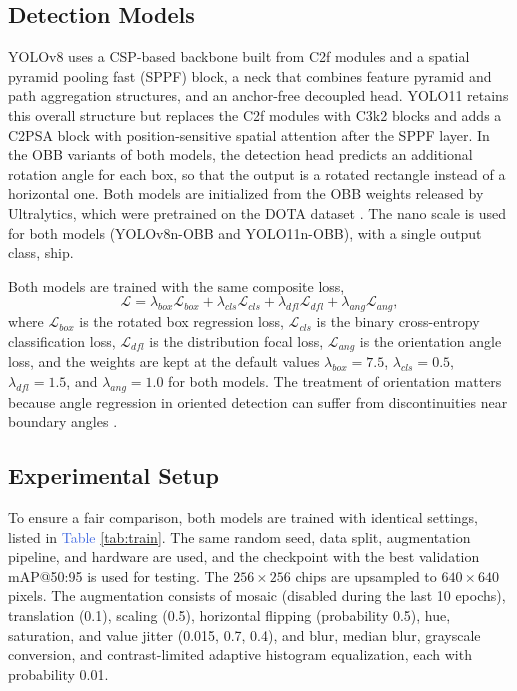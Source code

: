 \documentclass[conference]{IEEEtran}
\begin{document}
\subsection{Detection Models}
YOLOv8 \cite{yolov8} uses a CSP-based backbone built from C2f modules and a spatial pyramid pooling fast (SPPF) block, a neck that combines feature pyramid and path aggregation structures, and an anchor-free decoupled head. YOLO11 \cite{yolo11} retains this overall structure but replaces the C2f modules with C3k2 blocks and adds a C2PSA block with position-sensitive spatial attention after the SPPF layer. In the OBB variants of both models, the detection head predicts an additional rotation angle for each box, so that the output is a rotated rectangle instead of a horizontal one. Both models are initialized from the OBB weights released by Ultralytics, which were pretrained on the DOTA dataset \cite{xia2018dota}. The nano scale is used for both models (YOLOv8n-OBB and YOLO11n-OBB), with a single output class, ship.

Both models are trained with the same composite loss,
\begin{equation}
	\mathcal{L} = \lambda_{box}\mathcal{L}_{box} + \lambda_{cls}\mathcal{L}_{cls} + \lambda_{dfl}\mathcal{L}_{dfl} + \lambda_{ang}\mathcal{L}_{ang},
	\label{eq:loss}
\end{equation}
where $\mathcal{L}_{box}$ is the rotated box regression loss, $\mathcal{L}_{cls}$ is the binary cross-entropy classification loss, $\mathcal{L}_{dfl}$ is the distribution focal loss, $\mathcal{L}_{ang}$ is the orientation angle loss, and the weights are kept at the default values $\lambda_{box} = 7.5$, $\lambda_{cls} = 0.5$, $\lambda_{dfl} = 1.5$, and $\lambda_{ang} = 1.0$ for both models. The treatment of orientation matters because angle regression in oriented detection can suffer from discontinuities near boundary angles \cite{li2025obbcont}.

\subsection{Experimental Setup}
To ensure a fair comparison, both models are trained with identical settings, listed in \textcolor{RoyalBlue}{Table} \ref{tab:train}. The same random seed, data split, augmentation pipeline, and hardware are used, and the checkpoint with the best validation mAP@50:95 is used for testing. The $256 \times 256$ chips are upsampled to $640 \times 640$ pixels. The augmentation consists of mosaic (disabled during the last 10 epochs), translation (0.1), scaling (0.5), horizontal flipping (probability 0.5), hue, saturation, and value jitter (0.015, 0.7, 0.4), and blur, median blur, grayscale conversion, and contrast-limited adaptive histogram equalization, each with probability 0.01.
\end{document}
